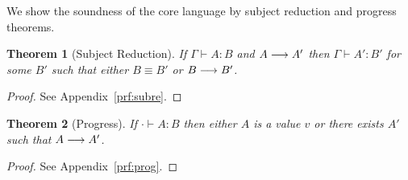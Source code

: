\newtheorem{thm}{Theorem}[section]
\newtheorem{cor}{Corollary}[thm]
\newtheorem{lem}[thm]{Lemma}

\newcommand{\dotctx}[1]{\ctx[\cdot]{#1}}
\newcommand{\dotctxw}[2]{\ctxw[\cdot]{#1}{#2}}

We show the soundness of the core language by subject reduction and
progress theorems.

\begin{thm}[Subject Reduction]
  If $\Gamma \vdash A:B$ and $A \longrightarrow A'$ then $\Gamma \vdash A':B'$
  for some $B'$ such that either $B \equiv B'$ or $B \longrightarrow B'$.
\end{thm}

\begin{proof}
See Appendix~\ref{prf:subre}.
\end{proof}

\begin{thm}[Progress]
  If $\cdot \vdash A:B$ then either $A$ is a value $v$ or there exists
  $A'$ such that $A \longrightarrow A'$.
\end{thm}

\begin{proof}
See Appendix~\ref{prf:prog}.
\end{proof}
